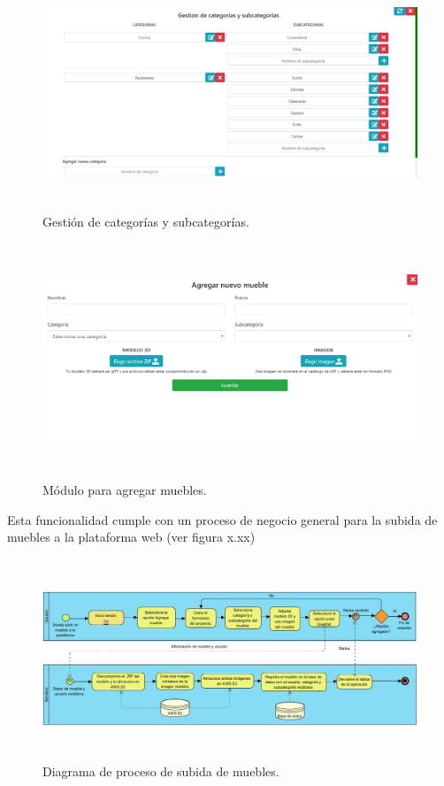 \begin{figure}[hbt!]
	\centering
	\includegraphics[width=15cm,height=7cm]{imagenes/desarrollo/app/WEB_CATEGORIES.png}
	\caption{Gestión de categorías y subcategorías.}
	\label{fig:webcat}
\end{figure}
\begin{figure}[hbt!]
	\centering
	\includegraphics[width=15cm,height=7cm]{imagenes/desarrollo/app/WEB_ADD.png}
	\caption{Módulo para agregar muebles.}
	\label{fig:webadd}
\end{figure}

Esta funcionalidad cumple con un proceso de negocio general para la subida de muebles a la plataforma web (ver figura x.xx)

\begin{figure}[h!]
	\centering
	\includegraphics[width=15cm,height=6cm]{imagenes/desarrollo/diagramas/BPMN_UPLOAD_FURNITURE.jpg}
	\caption{Diagrama de proceso de subida de muebles.}
	\label{fig:recover}
\end{figure}
\clearpage